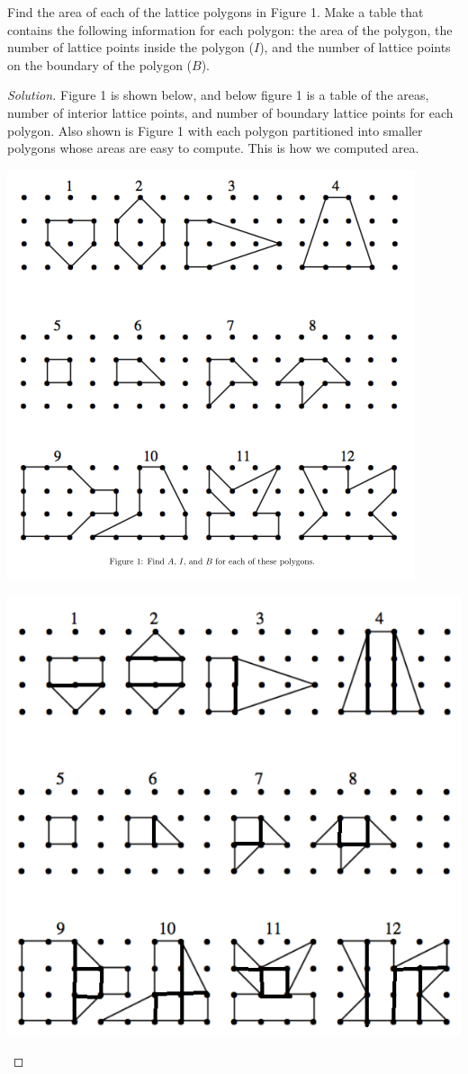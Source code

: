 \documentclass[12pt]{article}
\newenvironment{exercise}[2][Exercise]{\begin{trivlist}
        \item[\hskip \labelsep {\bfseries #1}\hskip \labelsep {\bfseries #2.}]}{\end{trivlist}}
\newenvironment{solution}
        {\begin{proof}[Solution]}
                    {\end{proof}}
\begin{document}
\begin{exercise}{15}
    Find the area of each of the lattice polygons in Figure 1. Make a table that contains the following information for each polygon: the area of the polygon, the number of lattice points inside the polygon (\( I \)), and the number of lattice points on the boundary of the polygon (\( B \)).
    \begin{solution}
        Figure 1 is shown below, and below figure 1 is a table of the areas, number of interior lattice points, and number of boundary lattice points for each polygon. Also shown is Figure 1 with each polygon partitioned into smaller polygons whose areas are easy to compute. This is how we computed area.
        \begin{center}
            \includegraphics[width=.65\linewidth]{15}
        \end{center}
        \begin{center}
            \includegraphics[width=.65\linewidth]{15-1}

\end{center}
\end{solution}
\end{exercise}
\end{document}

